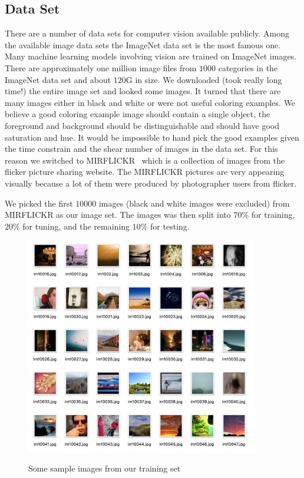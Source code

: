\documentclass[12pt]{article}
\begin{document}
\subsection{Data Set}
There are a number of data sets for computer vision available publicly. Among the available image data sets the ImageNet data set is the most famous one. Many machine learning models involving vision are trained on ImageNet images. There are approximately one million image files from $1000$ categories in the ImageNet data set and about $120$G in size. We downloaded (took really long time!) the entire image set and looked some images. It turned that there are many images either in black and white or were not useful coloring examples. We believe a good coloring example image should contain a single object, the foreground and background should be distinguishable and should have good saturation and hue. It would be impossible to hand pick the good examples given the time constrain and the shear number of images in the data set. For this reason we switched to MIRFLICKR~\cite{MIR08} which is a collection of images from the flicker picture sharing website. The MIRFLICKR pictures are very appearing visually because a lot of them were produced by photographer users from flicker. 

We picked the first $10000$ images (black and white images were excluded) from MIRFLICKR as our image set. The images was then split into $70\%$ for training, $20\%$ for tuning, and the remaining $10\%$ for testing. 

\begin{figure}[!ht]
 \centering
  \includegraphics[width=4.0in]{resource/exampleimages.png}
 \label{sampleimages}
 \caption{Some sample images from our training set}
\end{figure}
\end{document}

